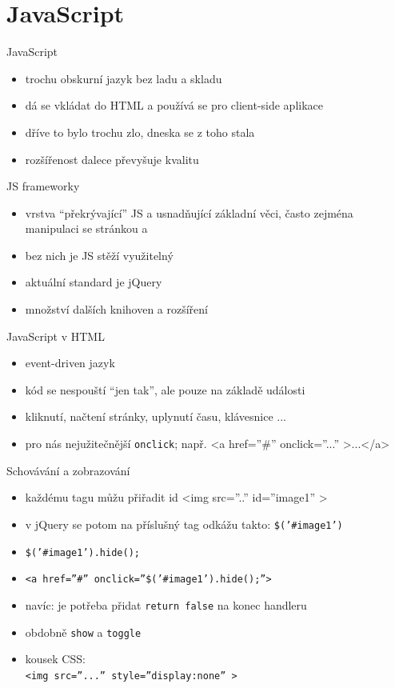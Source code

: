 \documentclass{beamer}
\begin{document}
\section{JavaScript}

\begin{frame}{JavaScript}
  \begin{itemize}
    \item trochu obskurní jazyk bez ladu a skladu
    \item dá se vkládat do HTML a používá se pro client-side aplikace
    \item dříve to bylo trochu zlo, dneska se z toho stala
    \item rozšířenost dalece převyšuje kvalitu
  \end{itemize}
\end{frame}

\begin{frame}{JS frameworky}
  \begin{itemize}
    \item vrstva ``překrývající'' JS a usnadňující základní věci, často zejména manipulaci se stránkou a
    \item bez nich je JS stěží využitelný
    \item aktuální standard je jQuery
    \item množství dalších knihoven a rozšíření
  \end{itemize}
\end{frame}

\begin{frame}{JavaScript v HTML}
  \begin{itemize}
    \item event-driven jazyk
    \item kód se nespouští ``jen tak'', ale pouze na základě události
    \item kliknutí, načtení stránky, uplynutí času, klávesnice ...
    \item pro nás nejužitečnější \texttt{onclick}; např. <a href=''\#'' onclick=''...'' >...</a>
  \end{itemize}
\end{frame}

\begin{frame}{Schovávání a zobrazování}
  \begin{itemize}
    \item každému tagu můžu přiřadit id <img src=''..'' id=''image1'' >
    \item v jQuery se potom na příslušný tag odkážu takto: \texttt{\$('\#image1')}
    \item \texttt{\$('\#image1').hide();}
    \item \texttt{<a href=''\#'' onclick=''\$('\#image1').hide();''>}
    \item navíc: je potřeba přidat \texttt{return false} na konec handleru
    \item obdobně \texttt{show} a \texttt{toggle}
    \item kousek CSS: \\ \texttt{<img src=''...'' style=''display:none'' >}
  \end{itemize}
\end{frame}
\end{document}
